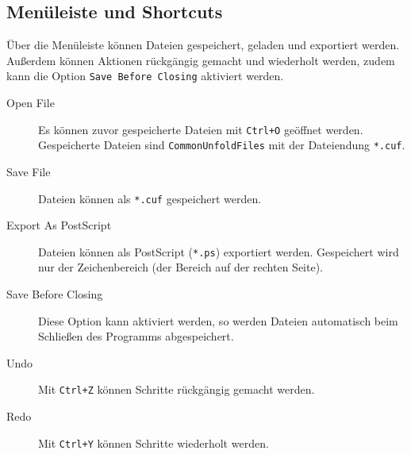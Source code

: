 \subsection{Menüleiste und Shortcuts}
\label{subsec:dateioperationen}

Über die Menüleiste können Dateien gespeichert, geladen und exportiert werden. Außerdem können Aktionen rückgängig gemacht und wiederholt werden, zudem kann die Option \texttt{Save Before Closing} aktiviert werden.

\begin{description}
  \item [Open File] Es können zuvor gespeicherte Dateien mit \texttt{Ctrl+O} geöffnet werden. Gespeicherte Dateien sind \texttt{CommonUnfoldFiles} mit der Dateiendung \texttt{*.cuf}.
  \item [Save File] Dateien können als \texttt{*.cuf} gespeichert werden.
  \item [Export As PostScript] Dateien können als PostScript (\texttt{*.ps}) exportiert werden. Gespeichert wird nur der Zeichenbereich (der Bereich auf der rechten Seite).
  \item [Save Before Closing] Diese Option kann aktiviert werden, so werden Dateien automatisch beim Schließen des Programms abgespeichert.
  \item [Undo] Mit \texttt{Ctrl+Z} können Schritte rückgängig gemacht werden.
  \item [Redo] Mit \texttt{Ctrl+Y} können Schritte wiederholt werden. 
\end{description}